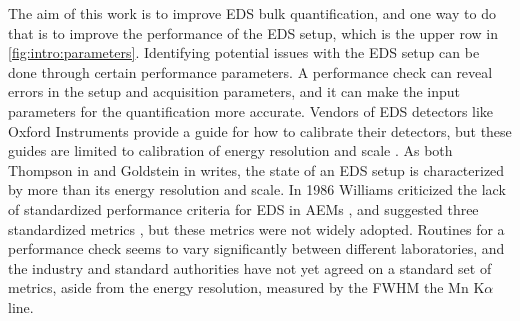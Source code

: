 The aim of this work is to improve EDS bulk quantification, and one way to do that is to improve the performance of the EDS setup, which is the upper row in \cref{fig:intro:parameters}.
Identifying potential issues with the EDS setup can be done through certain performance parameters.
A performance check can reveal errors in the setup and acquisition parameters, and it can make the input parameters for the quantification more accurate.
Vendors of EDS detectors like Oxford Instruments provide a guide for how to calibrate their detectors, but these guides are limited to calibration of energy resolution and scale \cite{aztec_manual}.
As both Thompson in \cite{keith_energy_res_2013} and Goldstein in \cite{goldstein_scanning_2018} writes, the state of an EDS setup is characterized by more than its energy resolution and scale.
In 1986 Williams criticized the lack of standardized performance criteria for EDS in AEMs , and suggested three standardized metrics \cite{williams_standard_definitions_1986}, but these metrics were not widely adopted.
Routines for a performance check seems to vary significantly between different laboratories, and the industry and standard authorities have not yet agreed on a standard set of metrics, aside from the energy resolution, measured by the FWHM the Mn K$\alpha$ line.


